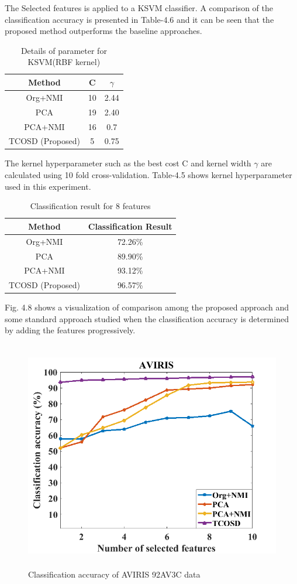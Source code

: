 \documentclass[document.tex]{subfiles}
\begin{document}
\noindent The Selected features is applied to a KSVM classifier. A comparison of the classification accuracy is presented in Table-4.6 and it can be seen that the proposed method outperforms the baseline approaches.
\begin{table}[H]
	\caption{Details of parameter for KSVM(RBF kernel)}
	\begin{center}
		\begin{tabular}{|c|c|c|}
			\hline
			Method & C & $\gamma$ \\ \hline
			Org+NMI & 10 & 2.44 \\ \hline
			PCA & 19 & 2.40 \\ \hline
			PCA+NMI & 16 & 0.7\\ \hline
			TCOSD (Proposed) & 5 & 0.75\\ \hline
		\end{tabular}
	\end{center}
	\label{tab:Details of parameter for KSVM(RBF kernel)}
\end{table}
\noindent The kernel hyperparameter such as the best cost C and kernel width $\gamma$ are calculated using 10 fold cross-validation\cite{29}. Table-4.5 shows kernel hyperparameter used in this experiment.
\begin{table}[H]
	\caption{Classification result for 8 features}
	\begin{center}
		\begin{tabular}{|c|c|}
			\hline
			Method & Classification Result\\ \hline
			Org+NMI & 72.26\%\\ \hline
			PCA & 89.90\%\\ \hline
			PCA+NMI & 93.12\%\\ \hline
			TCOSD (Proposed)& 96.57\%\\ \hline
		\end{tabular}
	\end{center}
	\label{tab:Classification result for 10 features}
\end{table}
\noindent Fig. 4.8 shows a visualization of comparison among the proposed approach and some standard approach studied when the classification accuracy is determined by adding the features progressively.\\
\begin{figure}[H]
	\begin{center}
		\includegraphics[height=10.0cm]{imgs/Res.png}
	\end{center}
	\caption{Classification accuracy of AVIRIS 92AV3C data}
	\label{fig:Classification accuracy of AVIRIS 92AV3C data}
\end{figure}
\end{document}
